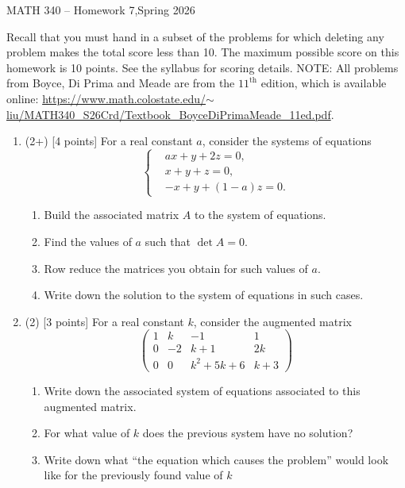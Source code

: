 \documentclass[12pt]{article}
\begin{document}
\begin{center}
    {\Large MATH 340 -- Homework 7,\quad Spring 2026}
\end{center}

Recall that you must hand in a subset of the problems for which deleting any problem makes the total score less than 10. The maximum possible score on this homework is 10 points. See the syllabus for scoring details. NOTE: All problems from Boyce, Di Prima and Meade are from the \(11^{\text{th}}\)  edition, which is available online: \href{https://www.math.colostate.edu/~liu/MATH340_S26Crd/Textbook_BoyceDiPrimaMeade_11ed.pdf}{https://www.math.colostate.edu/\(\sim\)liu/MATH340\_S26Crd/Textbook\_BoyceDiPrimaMeade\_11ed.pdf}.

\begin{enumerate}
  
  \item (2+) [4 points] For a real constant \(a\), consider the systems of equations 
  \[
  \left\lbrace
  \begin{aligned}
   &ax+y+2z=0,\\
   &x+y+z=0,\\
   &-x+y+(1-a)z=0.
  \end{aligned}
  \right.
  \]
  \begin{enumerate}
   \item Build the associated matrix \(A\) to the system of equations.
   \item Find the values of \(a\) such that \(\det A=0\).
   \item Row reduce the matrices you obtain for such values of \(a\).
   \item Write down the solution to the system of equations in such cases.
  \end{enumerate}

  \item (2) [3 points] For a real constant \(k\), consider the augmented matrix
  \[
  \left(\begin{array}{ccc|c}
      1&k & -1 & 1 \\
      0 & -2 & k+1 & 2k  \\
      0 & 0 & k^2+5k+6 & k+3  
    \end{array}\right)
    \]
    \begin{enumerate}
      \item Write down the associated system of equations associated to this augmented matrix.
      \item For what value of \(k\) does the previous system have no solution?
      \item Write down what ``the equation which causes the problem'' would look like for the previously found value of \(k\)
    \end{enumerate}


\end{enumerate}
\end{document}
